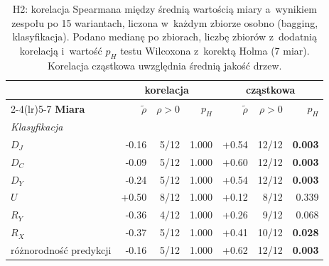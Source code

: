 \begin{table}[!htbp]
\centering\small
\caption{H2: korelacja Spearmana między średnią wartością miary a~wynikiem zespołu po 15 wariantach, liczona w~każdym zbiorze osobno (bagging, klasyfikacja). Podano medianę po zbiorach, liczbę zbiorów z~dodatnią korelacją i~wartość $p_H$ testu Wilcoxona z~korektą Holma (7 miar). Korelacja cząstkowa uwzględnia średnią jakość drzew.}
\label{tab:h2bag}
\begin{tabular}{lrrrrrr}
\toprule
& \multicolumn{3}{c}{\textbf{korelacja}} & \multicolumn{3}{c}{\textbf{cząstkowa}} \\
\cmidrule(lr){2-4}\cmidrule(lr){5-7}
\textbf{Miara} & $\tilde\rho$ & $\rho>0$ & $p_H$ & $\tilde\rho$ & $\rho>0$ & $p_H$ \\
\midrule
\multicolumn{7}{l}{\emph{Klasyfikacja}}\\
$D_J$ & -0.16 & 5/12 & 1.000 & +0.54 & 12/12 & \textbf{0.003} \\
$D_C$ & -0.09 & 5/12 & 1.000 & +0.60 & 12/12 & \textbf{0.003} \\
$D_Y$ & -0.24 & 5/12 & 1.000 & +0.54 & 12/12 & \textbf{0.003} \\
$U$ & +0.50 & 8/12 & 1.000 & +0.12 & 8/12 & 0.339 \\
$R_Y$ & -0.36 & 4/12 & 1.000 & +0.26 & 9/12 & 0.068 \\
$R_X$ & -0.37 & 5/12 & 1.000 & +0.41 & 10/12 & \textbf{0.028} \\
różnorodność predykcji & -0.16 & 5/12 & 1.000 & +0.62 & 12/12 & \textbf{0.003} \\
\bottomrule
\end{tabular}
\end{table}
